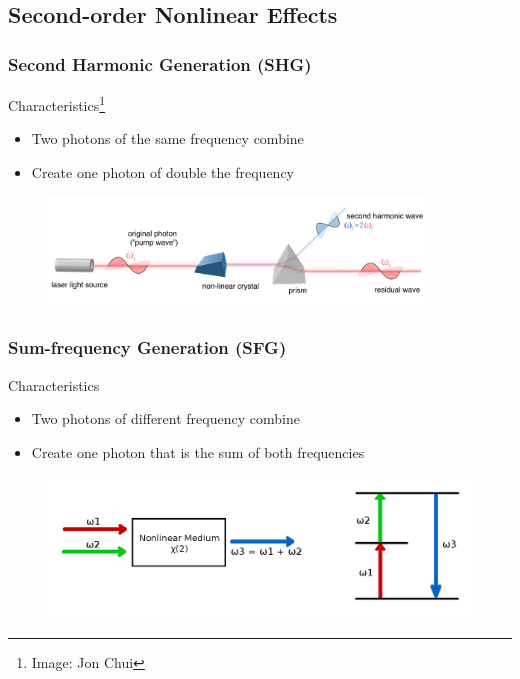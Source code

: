 \documentclass{beamer}
\begin{document}
\subsection{Second-order Nonlinear Effects}
\begin{frame}
\frametitle{Second Harmonic Generation (SHG)}
\begin{block}{Characteristics\footnote{Image: Jon Chui}}
\begin{itemize}
\item Two photons of the same frequency combine
\item Create one photon of double the frequency
\end{itemize}
\end{block}
\begin{figure}
\centering
\includegraphics[width=0.9\textwidth]{shg}
\end{figure}
\end{frame}

\begin{frame}
\frametitle{Sum-frequency Generation (SFG)}
\begin{block}{Characteristics}
\begin{itemize}
\item Two photons of different frequency combine
\item Create one photon that is the sum of both frequencies
\end{itemize}
\end{block}
\begin{figure}
\centering
\includegraphics[width=\textwidth]{sfg}
\end{figure}
\end{frame}
\end{document}
